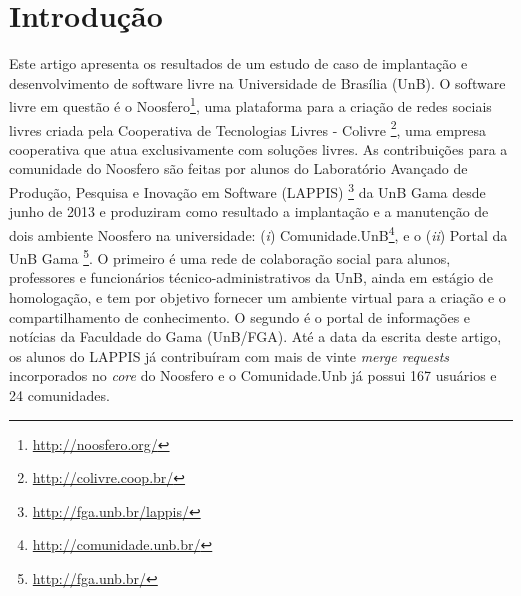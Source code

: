 \section{Introdução}
\label{sec:intro}

Este artigo apresenta os resultados de um estudo de caso de implantação e
desenvolvimento de software livre na Universidade de Brasília (UnB). O
software livre em questão é o Noosfero\footnote{\url{http://noosfero.org/}},
uma plataforma para a criação de redes sociais livres criada pela
Cooperativa de Tecnologias Livres - Colivre%
\footnote{\url{http://colivre.coop.br/}}, uma empresa cooperativa que atua
exclusivamente com soluções livres. As contribuições para a comunidade do
Noosfero são feitas por alunos do Laboratório Avançado de Produção,
Pesquisa e Inovação em Software (LAPPIS)%
\footnote{\url{http://fga.unb.br/lappis/}} da UnB Gama desde junho de 2013
e produziram como resultado a implantação e a manutenção de dois ambiente
Noosfero na universidade: (\textit{i}) Comunidade.UnB\footnote{%
\url{http://comunidade.unb.br/}}, e o (\textit{ii}) Portal da UnB Gama%
\footnote{\url{http://fga.unb.br/}}. O primeiro é uma rede de colaboração
social para alunos, professores e funcionários técnico-administrativos da
UnB, ainda em estágio de homologação, e tem por objetivo fornecer um ambiente
virtual para a criação e o compartilhamento de conhecimento. O segundo é o
portal de informações e notícias da Faculdade do Gama (UnB/FGA).
%
Até a data da escrita deste artigo, os alunos do LAPPIS já contribuíram com
mais de vinte \textit{merge requests} incorporados no \textit{core} do
Noosfero e o Comunidade.Unb já possui 167 usuários e 24 comunidades.
